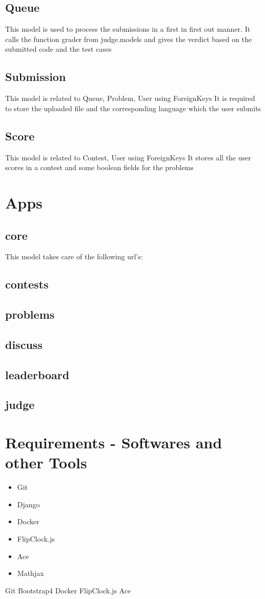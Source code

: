 \documentclass[hidelinks, a4paper,12pt, titlepage]{article}
\begin{document}
\subsection{Queue}
This model is used to process the submissions in a first in first out manner. It calls the function grader from judge.models and gives the verdict based on the submitted code and the test cases
\subsection{Submission}
This model is related to Queue, Problem, User using ForeignKeys
It is required to store the uploaded file and the corresponding language which the user submits 
\subsection{Score}
This model is related to Contest, User using ForeignKeys
It stores all the user scores in a contest and some boolean fields for the problems
\section{Apps}
\subsection{core}
This model takes care of the following url's:
\subsection{contests}
\subsection{problems}
\subsection{discuss}
\subsection{leaderboard}
\subsection{judge}

\section{Requirements - Softwares and other Tools}
\begin{itemize}
  \item Git
  \item Django
  \item Docker
  \item FlipClock.js
  \item Ace
  \item Mathjax
\end{itemize}
Git
Bootstrap4
Docker
FlipClock.js
Ace
\end{document}
